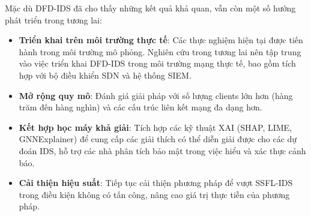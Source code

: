 Mặc dù DFD-IDS đã cho thấy những kết quả khả quan, vẫn còn một số hướng phát triển trong tương lai:

\begin{itemize}
    \item \textbf{Triển khai trên môi trường thực tế}: Các thực nghiệm hiện tại được tiến hành trong môi trường mô phỏng. Nghiên cứu trong tương lai nên tập trung vào việc triển khai DFD-IDS trong môi trường mạng thực tế, bao gồm tích hợp với bộ điều khiển SDN và hệ thống SIEM.
    \item \textbf{Mở rộng quy mô}: Đánh giá giải pháp với số lượng clients lớn hơn (hàng trăm đến hàng nghìn) và các cấu trúc liên kết mạng đa dạng hơn.
    \item \textbf{Kết hợp học máy khả giải}: Tích hợp các kỹ thuật XAI (SHAP, LIME, GNNExplainer) để cung cấp các giải thích có thể diễn giải được cho các dự đoán IDS, hỗ trợ các nhà phân tích bảo mật trong việc hiểu và xác thực cảnh báo.
    \item \textbf{Cải thiện hiệu suất}: Tiếp tục cải thiện phương pháp để vượt SSFL-IDS trong điều kiện không có tấn công, nâng cao giá trị thực tiễn của phương pháp.
\end{itemize}

\pagebreak
